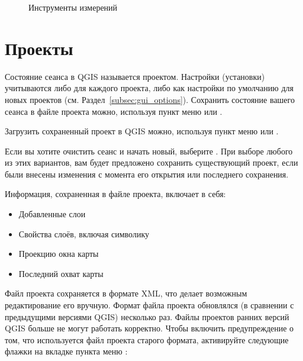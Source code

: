 \begin{figure}[ht]
\centering
     \hspace{0.33cm}
     \hspace{0.33cm}
   \caption{Инструменты измерений \wincaption} \label{fig:measure}
\end{figure}


\section{Проекты}\label{sec:projects}

Состояние сеанса в QGIS называется проектом. Настройки (установки) учитываются либо
для каждого проекта, либо как настройки по умолчанию для новых проектов
(см. Раздел~\ref{subsec:gui_options}). Сохранить состояние
вашего сеанса в файле проекта можно, используя пункт меню
 \arrow {}
или  \arrow
{}.

Загрузить сохраненный проект в QGIS можно, используя пункт меню
 \arrow {}
или  \arrow {}.

Если вы хотите очистить сеанс и начать новый, выберите 
\arrow {}. При выборе любого
из этих вариантов, вам будет предложено сохранить существующий проект, если
были внесены изменения с момента его открытия или последнего сохранения.

Информация, сохраненная в файле проекта, включает в себя:

\begin{itemize}
\item Добавленные слои
\item Свойства слоёв, включая символику
\item Проекцию окна карты
\item Последний охват карты
\end{itemize}

Файл проекта сохраняется в формате XML, что делает возможным редактирование
его вручную. Формат файла проекта обновлялся (в сравнении с
предыдущими версиями QGIS) несколько раз. Файлы проектов ранних версий
QGIS больше не могут работать корректно. Чтобы включить предупреждение о том, что
используется файл проекта старого формата, активируйте следующие флажки на вкладке
 пункта меню  \arrow {}: \\

